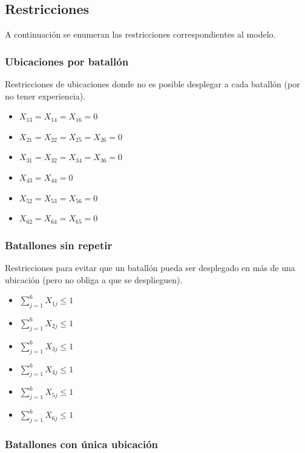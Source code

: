 \documentclass[12pt]{article}
\begin{document}
\subsection{Restricciones}

A continuación se enumeran las restricciones correspondientes al modelo.

\subsubsection{Ubicaciones por batallón}

Restricciones de ubicaciones donde no es posible desplegar a cada batallón (por no tener experiencia).

\begin{itemize}
    \item $X_{13} = X_{14} = X_{16} = 0$
    \item $X_{21} = X_{22} = X_{25} = X_{26} = 0$
    \item $X_{31} = X_{32} = X_{34} = X_{36} = 0$
    \item $X_{43} = X_{44} = 0$
    \item $X_{52} = X_{53} = X_{56} = 0$
    \item $X_{62} = X_{64} = X_{65} = 0$
\end{itemize}

\subsubsection{Batallones sin repetir}

Restricciones para evitar que un batallón pueda ser desplegado en más de una ubicación (pero no obliga a que se desplieguen).

\begin{itemize}
    \item $\sum_{j=1}^{6} X_{1j} \leq 1$
    \item $\sum_{j=1}^{6} X_{2j} \leq 1$
    \item $\sum_{j=1}^{6} X_{3j} \leq 1$
    \item $\sum_{j=1}^{6} X_{4j} \leq 1$
    \item $\sum_{j=1}^{6} X_{5j} \leq 1$
    \item $\sum_{j=1}^{6} X_{6j} \leq 1$
\end{itemize}

\subsubsection{Batallones con única ubicación}
\end{document}

